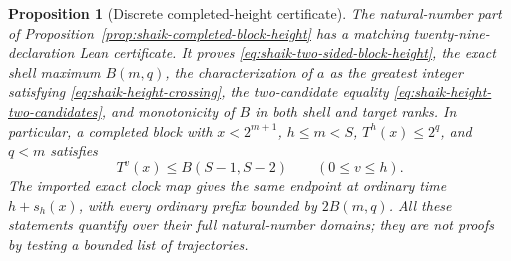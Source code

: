\documentclass[11pt]{article}
\newtheorem{proposition}{Proposition}
\theoremstyle{remark}\newtheorem{remark}[proposition]{Remark}
\begin{document}
\begin{proposition}[Discrete completed-height certificate]
\label{prop:shaik-completed-height-certificate}
The natural-number part of
Proposition~\ref{prop:shaik-completed-block-height} has a matching
twenty-nine-declaration Lean certificate. It proves
\eqref{eq:shaik-two-sided-block-height}, the exact shell maximum \(B(m,q)\),
the characterization of \(a\) as the greatest integer satisfying
\eqref{eq:shaik-height-crossing}, the two-candidate equality
\eqref{eq:shaik-height-two-candidates}, and monotonicity of \(B\) in both
shell and target ranks. In particular, a completed block with
\(x<2^{m+1}\), \(h\le m<S\), \(T^h(x)\le2^q\), and \(q<m\) satisfies
\[
 T^v(x)\le B(S-1,S-2)\qquad(0\le v\le h).
\]
The imported exact clock map gives the same endpoint at ordinary time
\(h+s_h(x)\), with every ordinary prefix bounded by \(2B(m,q)\).
All these statements quantify over their full natural-number domains;
they are not proofs by testing a bounded list of trajectories.
\end{proposition}
\end{document}
